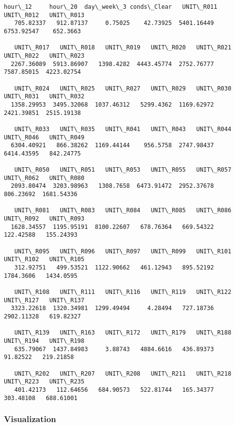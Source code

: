 \documentclass{article}
\begin{document}
    \begin{Verbatim}[commandchars=\\\{\}]
hour\_12     hour\_20  day\_week\_3 conds\_Clear   UNIT\_R011   UNIT\_R012   UNIT\_R013
   705.82337   912.87137     0.75025    42.73925  5401.16449  6753.92547    652.3663

   UNIT\_R017   UNIT\_R018   UNIT\_R019   UNIT\_R020   UNIT\_R021   UNIT\_R022   UNIT\_R023
  2267.36089  5913.86907   1398.4282  4443.45774  2752.76777  7587.85015  4223.02754

   UNIT\_R024   UNIT\_R025   UNIT\_R027   UNIT\_R029   UNIT\_R030   UNIT\_R031   UNIT\_R032
  1358.29953  3495.32068  1037.46312   5299.4362  1169.62972  2421.39851  2515.19138

   UNIT\_R033   UNIT\_R035   UNIT\_R041   UNIT\_R043   UNIT\_R044   UNIT\_R046   UNIT\_R049
  6304.40921   866.38262  1169.44144    956.5758  2747.98437  6414.43595   842.24775

   UNIT\_R050   UNIT\_R051   UNIT\_R053   UNIT\_R055   UNIT\_R057   UNIT\_R062   UNIT\_R080
  2093.80474  3203.98963   1308.7658  6473.91472  2952.37678   806.23692  1681.54336

   UNIT\_R081   UNIT\_R083   UNIT\_R084   UNIT\_R085   UNIT\_R086   UNIT\_R092   UNIT\_R093
  1628.34557  1195.95191  8100.22607   678.76364   669.54322   122.42588   155.24393

   UNIT\_R095   UNIT\_R096   UNIT\_R097   UNIT\_R099   UNIT\_R101   UNIT\_R102   UNIT\_R105
   312.92751   499.53521  1122.90662   461.12943   895.52192   1784.3606   1434.0595

   UNIT\_R108   UNIT\_R111   UNIT\_R116   UNIT\_R119   UNIT\_R122   UNIT\_R127   UNIT\_R137
  3323.22618  1320.34981  1299.49494     4.28494   727.18736  2902.11328   619.82327

   UNIT\_R139   UNIT\_R163   UNIT\_R172   UNIT\_R179   UNIT\_R188   UNIT\_R194   UNIT\_R198
   635.79067  1437.84983     3.88743   4884.6616   436.89373    91.82522   219.21858

   UNIT\_R202   UNIT\_R207   UNIT\_R208   UNIT\_R211   UNIT\_R218   UNIT\_R223   UNIT\_R235
   401.42173   112.64656   684.90573   522.81744   165.34377   303.48108   688.61001
    \end{Verbatim}

    \subsubsection{Visualization}\label{visualization}
\end{document}
